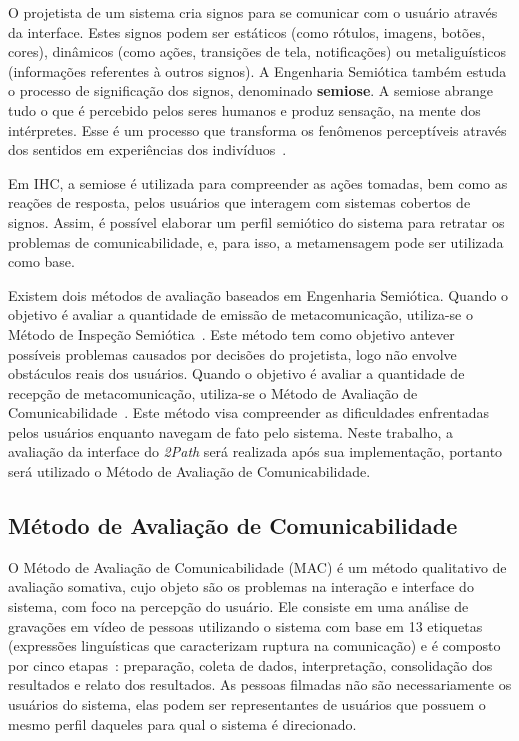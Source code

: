 \indent O projetista de um sistema cria signos para se comunicar com o usuário através da interface. Estes signos podem ser estáticos (como rótulos, imagens, botões, cores), dinâmicos (como ações, transições de tela, notificações) ou metaliguísticos (informações referentes à outros signos). A Engenharia Semiótica também estuda o processo de significação dos signos, denominado \textbf{semiose}. A semiose abrange tudo o que é percebido pelos seres humanos e produz sensação, na mente dos intérpretes. Esse é um processo que transforma os fenômenos perceptíveis através dos sentidos em experiências dos indivíduos~\cite{semiose01}. 

\indent Em IHC, a semiose é utilizada para compreender as ações tomadas, bem como as reações de resposta, pelos usuários que interagem com sistemas cobertos de signos. Assim, é possível elaborar um perfil semiótico do sistema para retratar os problemas de comunicabilidade, e, para isso, a metamensagem pode ser utilizada como base.

\indent Existem dois métodos de avaliação baseados em Engenharia Semiótica. Quando o objetivo é avaliar a quantidade de emissão de metacomunicação, utiliza-se o Método de Inspeção Semiótica~\cite{IHCbook}. Este método tem como objetivo antever possíveis problemas causados por decisões do projetista, logo não envolve obstáculos reais dos usuários. Quando o objetivo é avaliar a quantidade de recepção de metacomunicação, utiliza-se o Método de Avaliação de Comunicabilidade~\cite{IHCbook}. Este método visa compreender as dificuldades enfrentadas pelos usuários enquanto navegam de fato pelo sistema. Neste trabalho, a avaliação da interface do \textit{2Path} será realizada após sua implementação, portanto será utilizado o Método de Avaliação de Comunicabilidade.


\subsection{Método de Avaliação de Comunicabilidade} \label{MAC}

\indent O Método de Avaliação de Comunicabilidade (MAC) é um método qualitativo de avaliação somativa, cujo objeto são os problemas na interação e interface do sistema, com foco na percepção do usuário. Ele consiste em uma análise de gravações em vídeo de pessoas utilizando o sistema com base em 13 etiquetas (expressões linguísticas que caracterizam ruptura na comunicação) e é composto por cinco etapas~\cite{IHCbook}: preparação, coleta de dados, interpretação, consolidação dos resultados e relato dos resultados. As pessoas filmadas não são necessariamente os usuários do sistema, elas podem ser representantes de usuários que possuem o mesmo perfil daqueles para qual o sistema é direcionado. 

